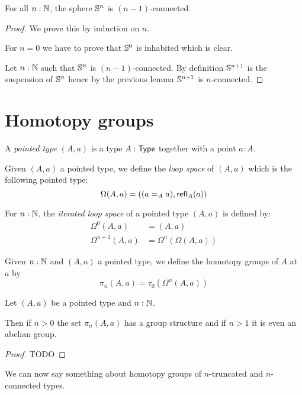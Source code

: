 \begin{cor}
  For all $n:\mathbb{N}$, the sphere $\mathbb{S}^n$ is $(n-1)$-connected.
\end{cor}

\begin{proof}
  We prove this by induction on $n$.

  For $n=0$ we have to prove that $\mathbb{S}^0$ is inhabited which is clear.

  Let $n:\mathbb{N}$ such that $\mathbb{S}^n$ is $(n-1)$-connected. By definition $\mathbb{S}^{n+1}$
  is the suspension of $\mathbb{S}^n$ hence by the previous lemma $\mathbb{S}^{n+1}$ is
  $n$-connected.
\end{proof}

\section{Homotopy groups}

\begin{defn}
  A \emph{pointed type} $(A,a)$ is a type $A:\mathsf{Type}$ together with a point $a:A$.
\end{defn}

\begin{defn}
  Given $(A,a)$ a pointed type, we define the \emph{loop space} of $(A,a)$ which
  is the following pointed type:
  \[\Omega(A,a)=((a=_Aa),\mathsf{refl}_{A}(a))\]

  For $n:\mathbb{N}$, the \emph{iterated loop space} of a pointed type $(A,a)$ is
  defined by:
  \begin{align*}
    \Omega^0(A,a)&=(A,a)\\
    \Omega^{n+1}(A,a)&=\Omega^n(\Omega(A,a))
  \end{align*}
\end{defn}

\begin{defn}
  Given $n:\mathbb{N}$ and $(A,a)$ a pointed type, we define the homotopy groups of $A$
  at $a$ by
  \[\pi_n(A,a)=\tau_0(\Omega^n(A,a))\]
\end{defn}

\begin{lem}
  Let $(A,a)$ be a pointed type and $n:\mathbb{N}$.

  Then if $n>0$ the set $\pi_n(A,a)$ has a group structure and if $n>1$ it is
  even an abelian group.
\end{lem}

\begin{proof}
  TODO
\end{proof}

We can now say something about homotopy groups of $n$-truncated and
$n$-connected types.

